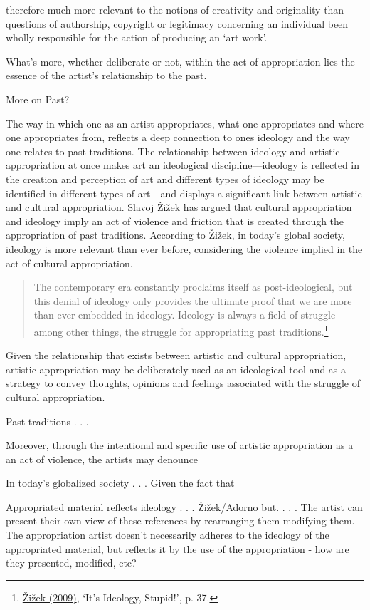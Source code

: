 therefore much more relevant to the notions of creativity and originality than questions of authorship, copyright or legitimacy concerning an individual been wholly responsible for the action of producing an `art work'.

What's more, whether deliberate or not, within the act of appropriation lies the essence of the artist's relationship to the past. 

More on Past?

The way in which one as an artist appropriates, what one appropriates and where one appropriates from, reflects a deep connection to ones ideology and the way one relates to past traditions. The relationship between ideology and artistic appropriation at once makes art an ideological discipline---ideology is reflected in the creation and perception of art and different types of ideology may be identified in different types of art---and displays a significant link between artistic and cultural appropriation. Slavoj \v{Z}i\v{z}ek has argued that cultural appropriation and ideology imply an act of violence and friction that is created through the appropriation of past traditions. According to \v{Z}i\v{z}ek, in today's global society, ideology is more relevant than ever before, considering the violence implied in the act of cultural appropriation.
\begin{quote}
The contemporary era constantly proclaims itself as post-ideological, but this denial of ideology only provides the ultimate proof that we are more than ever embedded in ideology. Ideology is always a field of struggle---among other things, the struggle for appropriating past traditions.\footnote{\hyperlink{zizektragedy}{\v{Z}i\v{z}ek (2009)}, `It's Ideology, Stupid!', p. 37.}
\end{quote}
Given the relationship that exists between artistic and cultural appropriation, artistic appropriation may be deliberately used as an ideological tool and as a strategy to convey thoughts, opinions and feelings associated with the struggle of cultural appropriation. 

Past traditions . . .

Moreover, through the intentional and specific use of artistic appropriation as a an act of violence, the artists may denounce 

In today's globalized society . . . Given the fact that 

Appropriated material reflects ideology . . . \v{Z}i\v{z}ek/Adorno but. . . . The artist can present their own view of these references by rearranging them modifying them. The appropriation artist doesn't necessarily adheres to the ideology of the appropriated material, but reflects it by the use of the appropriation - how are they presented, modified, etc?  



